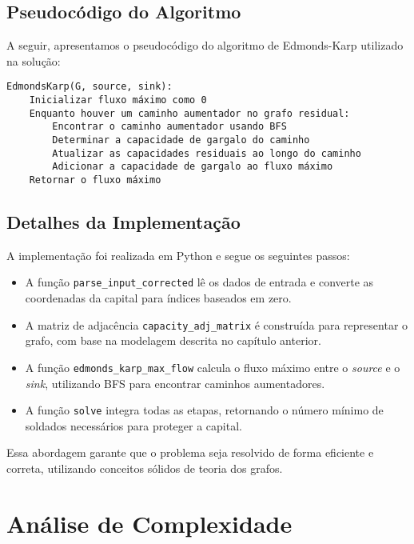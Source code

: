 \documentclass[a4paper,12pt]{article}
\begin{document}
\subsection*{Pseudocódigo do Algoritmo}

A seguir, apresentamos o pseudocódigo do algoritmo de Edmonds-Karp utilizado na
solução:

\begin{verbatim}
EdmondsKarp(G, source, sink):
    Inicializar fluxo máximo como 0
    Enquanto houver um caminho aumentador no grafo residual:
        Encontrar o caminho aumentador usando BFS
        Determinar a capacidade de gargalo do caminho
        Atualizar as capacidades residuais ao longo do caminho
        Adicionar a capacidade de gargalo ao fluxo máximo
    Retornar o fluxo máximo
\end{verbatim}

\subsection*{Detalhes da Implementação}

A implementação foi realizada em Python e segue os seguintes passos:

\begin{itemize}
    \item A função \texttt{parse\_input\_corrected} lê os dados de entrada e converte as
          coordenadas da capital para índices baseados em zero.
    \item A matriz de adjacência \texttt{capacity\_adj\_matrix} é construída para
          representar o grafo, com base na modelagem descrita no capítulo anterior.
    \item A função \texttt{edmonds\_karp\_max\_flow} calcula o fluxo máximo entre o
          \textit{source} e o \textit{sink}, utilizando BFS para encontrar caminhos
          aumentadores.
    \item A função \texttt{solve} integra todas as etapas, retornando o número mínimo de
          soldados necessários para proteger a capital.
\end{itemize}

Essa abordagem garante que o problema seja resolvido de forma eficiente e
correta, utilizando conceitos sólidos de teoria dos grafos.

\section*{Análise de Complexidade}
\end{document}
